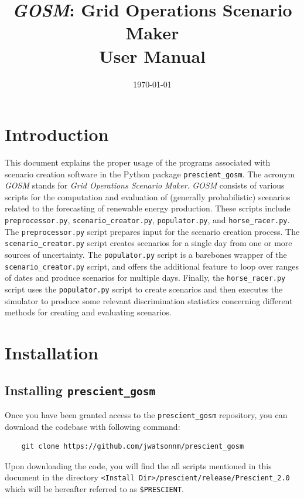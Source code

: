 \documentclass[11pt]{article}
\begin{document}
\title{\textsl{GOSM}: Grid Operations Scenario Maker \\ User Manual}
\date{\today}

\maketitle

\section{Introduction}
This document explains the proper usage of the programs associated with scenario creation software in the Python package \texttt{prescient\_gosm}. 
The acronym \textit{GOSM} stands for \textit{Grid Operations Scenario Maker}. \textit{GOSM} consists of various scripts for the computation 
and evaluation of (generally probabilistic) scenarios related to the forecasting of renewable energy production. These scripts include 
\texttt{preprocessor.py}, \texttt{scenario\_creator.py}, \texttt{populator.py}, and \texttt{horse\_racer.py}. The \texttt{preprocessor.py} script
prepares input   for the scenario creation process. The \texttt{scenario\_creator.py} script creates scenarios for a single day from 
one or more sources of uncertainty. The \texttt{populator.py} script is a barebones wrapper of the \texttt{scenario\_creator.py} script, and
offers the additional feature to loop over ranges of dates and produce scenarios for multiple days. Finally, the \texttt{horse\_racer.py} script
uses the \texttt{populator.py} script to create scenarios and then executes the simulator  to produce some 
relevant discrimination statistics concerning different methods for creating and evaluating scenarios.

\section{Installation}

\subsection{Installing \texttt{prescient\_gosm}}
Once you have been granted access to the \texttt{prescient\_gosm} repository, you can download
the codebase with following command:
\begin{verbatim}
	git clone https://github.com/jwatsonnm/prescient_gosm
\end{verbatim}

Upon downloading the code, you will find the all scripts mentioned in this document in the directory \texttt{<Install Dir>/prescient/release/Prescient\_2.0} which will be hereafter referred to as \texttt{\$PRESCIENT}.
\end{document}
